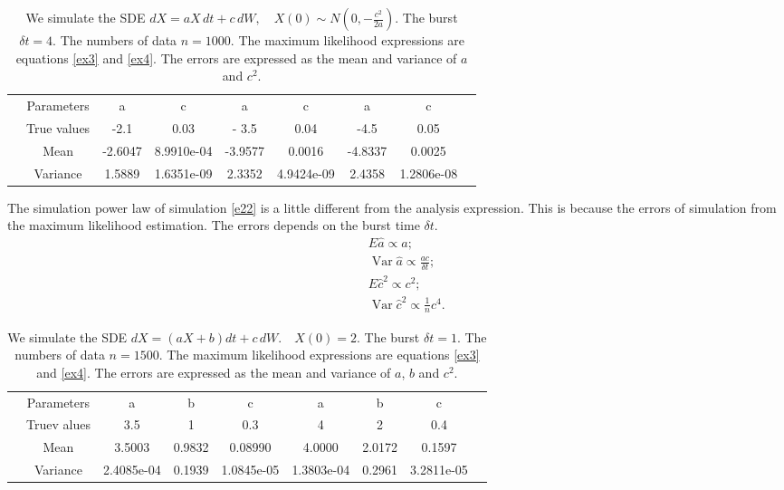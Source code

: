 \documentclass[12pt,reqno, a4paper]{article}
\numberwithin{equation}{section}
\begin{document}
\begin{table}[htbp]
  \caption{\label{tab1} We simulate the \textsc{SDE}
$
dX=aX\, dt+c\, dW,   \quad  X(0)\sim N(0, -\frac {c^2}{2a} ).
$  The burst  $\delta t=4$. The numbers of data $n=1000$. The maximum likelihood expressions are equations \eqref{ex3} and \eqref{ex4}. The errors are expressed as the mean  and variance of  $a$ and $c^2$. }
 \begin{tabular}{ccccccccc}
  \toprule
  &Parameters & a & c &  a & c& a & c\\
  &  True values  &-2.1 & 0.03 &- 3.5 & 0.04&-4.5 &0.05 \\
  \midrule
&Mean& -2.6047 &8.9910e-04&-3.9577&0.0016& -4.8337&0.0025 \\
& Variance &1.5889&1.6351e-09 &2.3352& 4.9424e-09 & 2.4358&1.2806e-08 \\
  \bottomrule
 \end{tabular}

\end{table}
The simulation power law of simulation \eqref{e22} is a little different from the analysis expression. This is because the errors of simulation  from the maximum likelihood  estimation. The errors depends on the burst time $\delta t$.
\begin{eqnarray*}&&E\hat{a}\propto a; \\ &&\operatorname{Var} \hat{a}\propto \frac {a c}{\delta t};\\
&&E\hat{c}^2\propto
 c^2 ; \\
&&\operatorname{Var} \hat{c}^2\propto \frac {1}{n} c^4.
\end{eqnarray*}
\begin{table}[htbp]
  \caption{\label{tab1} We simulate the \textsc{SDE}
$
dX=(aX+b)dt+c\,dW. \quad  X(0)=2.
$  The burst  $\delta t=1$. The numbers of data $n=1500$. The maximum likelihood expressions are equations \eqref{ex3} and \eqref{ex4}. The errors are expressed as the mean  and variance of  $a$, $b$ and $c^2$. }
 \begin{tabular}{ccccccccc}
  \toprule
  &Parameters & a & b &  c & a& b & c\\
  &  Truev alues  &3.5& 1 &0.3 & 4&2 &0.4 \\
  \midrule
&Mean& 3.5003 &0.9832& 0.08990&4.0000& 2.0172&0.1597 \\
& Variance & 2.4085e-04&0.1939 &1.0845e-05 &  1.3803e-04 &0.2961& 3.2811e-05 \\
  \bottomrule
 \end{tabular}

\end{table}
\end{document}

